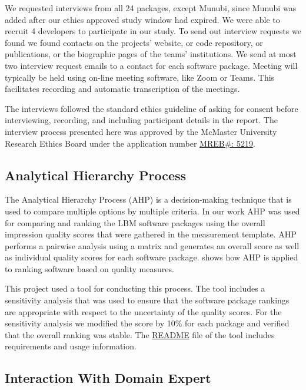 \documentclass[final, 3p, times, authoryear]{elsarticle}
\begin{document}
We requested interviews from all 24 packages, except Munubi, since Munubi was
added after our ethics approved study window had expired.  We were able to
recruit 4 developers to participate in our study.  To send out interview
requests we found we found contacts on the projects’ website, or code
repository, or publications, or the biographic pages of the teams’ institutions.
We send at most two interview request emails to a contact for each software
package.  Meeting will typically be held using on-line meeting software, like
Zoom or Teams.  This facilitates recording and automatic transcription of the
meetings.

The interviews followed the standard ethics guideline of asking for consent
before interviewing, recording, and including participant details in the report.
The interview process presented here was approved by the McMaster University
Research Ethics Board under the application number 
\href{https://github.com/smiths/AIMSS/blob/master/StateOfPractice/MACREM/Application.pdf}
{MREB\#: 5219}.

\subsection{Analytical Hierarchy Process} \label{AHP}

The Analytical Hierarchy Process (AHP) is a decision-making technique that is
used to compare multiple options by multiple criteria. In our work AHP was used
for comparing and ranking the LBM software packages using the overall impression
quality scores that were gathered in the measurement template.  AHP performs a
pairwise analysis using a matrix and generates an overall score as well as
individual quality scores for each software package. \citep{SmithEtAl2016} shows
how AHP is applied to ranking software based on quality measures. 

This project used a tool for conducting this process. The tool includes a
sensitivity analysis that was used to ensure that the software package rankings
are appropriate with respect to the uncertainty of the quality scores. For the
sensitivity analysis we modified the score by 10\% for each package and verified
that the overall ranking was stable.  The
\href{https://github.com/smiths/AIMSS/blob/master/StateOfPractice/AHP2020/LBM/README.txt}{README}
file of the tool includes requirements and usage information.

\subsection{Interaction With Domain Expert} \label{sec_vet_software_list}
\end{document}

